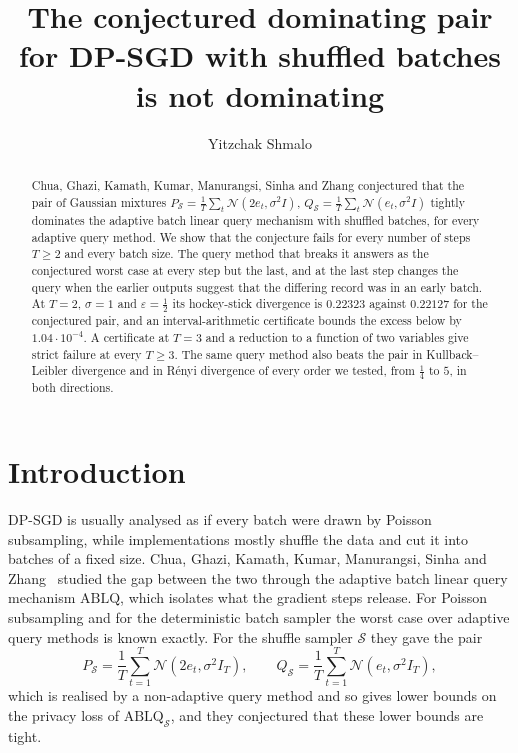 \documentclass[11pt]{amsart}
\title[The conjectured pair for shuffled ABLQ is not dominating]{The conjectured dominating pair for DP-SGD with shuffled batches is not dominating}
\author{Yitzchak Shmalo}
\theoremstyle{definition}
\theoremstyle{remark}
\newcommand{\N}{\mathcal N}
\begin{document}
\begin{abstract}
Chua, Ghazi, Kamath, Kumar, Manurangsi, Sinha and Zhang conjectured that the pair of Gaussian mixtures $P_{\mathcal S}=\frac1T\sum_t\N(2e_t,\sigma^2I)$, $Q_{\mathcal S}=\frac1T\sum_t\N(e_t,\sigma^2I)$ tightly dominates the adaptive batch linear query mechanism with shuffled batches, for every adaptive query method. We show that the conjecture fails for every number of steps $T\ge2$ and every batch size. The query method that breaks it answers as the conjectured worst case at every step but the last, and at the last step changes the query when the earlier outputs suggest that the differing record was in an early batch. At $T=2$, $\sigma=1$ and $\varepsilon=\frac12$ its hockey-stick divergence is $0.22323$ against $0.22127$ for the conjectured pair, and an interval-arithmetic certificate bounds the excess below by $1.04\cdot10^{-4}$. A certificate at $T=3$ and a reduction to a function of two variables give strict failure at every $T\ge3$. The same query method also beats the pair in Kullback--Leibler divergence and in R\'enyi divergence of every order we tested, from $\frac14$ to $5$, in both directions.
\end{abstract}
\maketitle

\section{Introduction}

DP-SGD is usually analysed as if every batch were drawn by Poisson subsampling, while implementations mostly shuffle the data and cut it into batches of a fixed size. Chua, Ghazi, Kamath, Kumar, Manurangsi, Sinha and Zhang~\cite{CGKKMSZ24} studied the gap between the two through the adaptive batch linear query mechanism $\mathrm{ABLQ}$, which isolates what the gradient steps release. For Poisson subsampling and for the deterministic batch sampler the worst case over adaptive query methods is known exactly. For the shuffle sampler $\mathcal S$ they gave the pair
\begin{equation}\label{eq:pair}
P_{\mathcal S}=\frac1T\sum_{t=1}^T\N(2e_t,\sigma^2I_T),\qquad Q_{\mathcal S}=\frac1T\sum_{t=1}^T\N(e_t,\sigma^2I_T),
\end{equation}
which is realised by a non-adaptive query method and so gives lower bounds on the privacy loss of $\mathrm{ABLQ}_{\mathcal S}$, and they conjectured that these lower bounds are tight.
\end{document}
